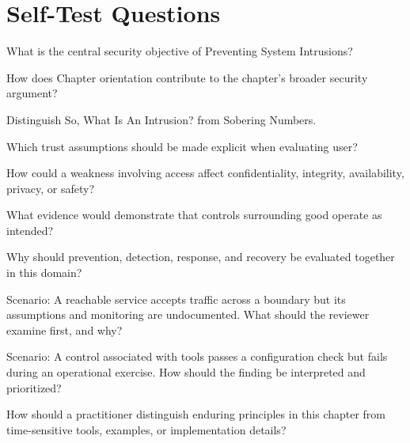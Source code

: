 \documentclass[11pt,letterpaper]{article}
\begin{document}
\section*{Self-Test Questions}
\begin{CornellRecallList}
\item What is the central security objective of Preventing System Intrusions?
\item How does Chapter orientation contribute to the chapter's broader security argument?
\item Distinguish So, What Is An Intrusion? from Sobering Numbers.
\item Which trust assumptions should be made explicit when evaluating user?
\item How could a weakness involving access affect confidentiality, integrity, availability, privacy, or safety?
\item What evidence would demonstrate that controls surrounding good operate as intended?
\item Why should prevention, detection, response, and recovery be evaluated together in this domain?
\item Scenario: A reachable service accepts traffic across a boundary but its assumptions and monitoring are undocumented. What should the reviewer examine first, and why?
\item Scenario: A control associated with tools passes a configuration check but fails during an operational exercise. How should the finding be interpreted and prioritized?
\item How should a practitioner distinguish enduring principles in this chapter from time-sensitive tools, examples, or implementation details?
\end{CornellRecallList}
\end{document}
